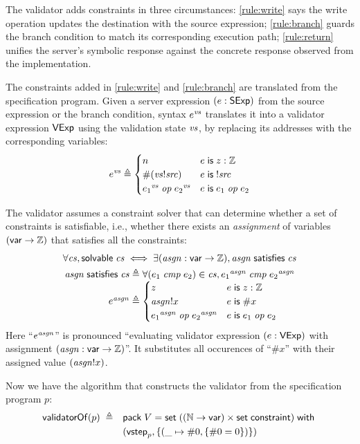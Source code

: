 The validator adds constraints in three circumstances: \autoref{rule:write} says
the write operation updates the destination with the source expression;
\autoref{rule:branch} guards the branch condition to match its corresponding
execution path; \autoref{rule:return} unifies the server's symbolic response
against the concrete response observed from the implementation.

The constraints added in \autoref{rule:write} and \autoref{rule:branch} are
translated from the specification program.  Given a server expression
$(e:\mathsf{SExp})$ from the source expression or the branch condition, syntax $e^{\mathit{vs}}$
translates it into a validator expression $\mathsf{VExp}$ using the validation state
$\mathit{vs}$, by replacing its addresses with the corresponding variables:
\[e^{\mathit{vs}}\triangleq\begin{cases}
  n&e\;\mathsf{is}\; z:\mathbb Z\\
  \#(\mathit{vs}!\mathit{src})&e\;\mathsf{is}\;!\mathit{src}\\
  {e_1}^{\mathit{vs}}\;\mathit{op}\;{e_2}^{\mathit{vs}}&e\;\mathsf{is}\; e_1\;\mathit{op}\; e_2
\end{cases}\]

The validator assumes a constraint solver that can determine whether a set of
constraints is satisfiable, i.e., whether there exists an {\em assignment}
of variables $(\mathsf{var}\to\mathbb Z)$ that satisfies all the constraints:
\begin{gather*}
  \forall \cs,\solvable \cs\iff\exists (\asgn:\Var\to\Int),\satisfy{\asgn}\cs\\
  \begin{array}{r@{\;}l}
    \satisfy{\asgn}\cs\triangleq&\forall(e_1\ccmp e_2)\in \cs, {e_1}^{\asgn}\ccmp{e_2}^{\asgn}\\
    e^{\asgn}\triangleq&\begin{cases}
      z&e\Is z:\Int\\
      \asgn!x&e\Is \#x\\
      {e_1}^{\asgn}\oop{e_2}^{\asgn}&e\Is e_1\oop e_2
    \end{cases}
  \end{array}
\end{gather*}
Here ``$e^{\mathit{asgn}}$'' is pronounced ``evaluating validator expression $(e:\mathsf{VExp})$
with assignment $(\mathit{asgn}:\mathsf{var}\to\mathbb Z)$''.  It substitutes all occurences of
``$\#x$'' with their assigned value $(\mathit{asgn}!x)$.

Now we have the algorithm that constructs the validator from the specification
program $p$:
\begin{align*}\mathsf{validatorOf}(p)\;\triangleq\quad&\mathsf{pack}\;V=\mathsf{set}\;((\mathbb N\to\mathsf{var})\times\mathsf{set}\;\mathsf{constraint})\;\mathsf{with}\;\\
  &(\mathsf{vstep}_p,\{(\_\mapsto\#0,\{\#0=0\})\})
\end{align*}

